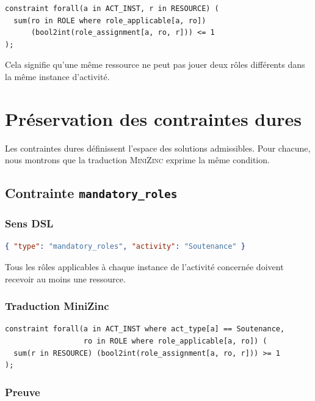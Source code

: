 \documentclass[12pt,a4paper]{article}
\newcommand{\MZN}{\textsc{MiniZinc}}
\begin{document}
\begin{lstlisting}[language=MiniZinc]
constraint forall(a in ACT_INST, r in RESOURCE) (
  sum(ro in ROLE where role_applicable[a, ro])
      (bool2int(role_assignment[a, ro, r])) <= 1
);
\end{lstlisting}

Cela signifie qu'une même ressource ne peut pas jouer deux rôles différents dans la même instance d'activité.

\section{Préservation des contraintes dures}

Les contraintes dures définissent l'espace des solutions admissibles. Pour chacune, nous montrons que la traduction \MZN{} exprime la même condition.

\subsection{Contrainte \texttt{mandatory\_roles}}

\subsubsection*{Sens DSL}

\begin{lstlisting}[language=JSON]
{ "type": "mandatory_roles", "activity": "Soutenance" }
\end{lstlisting}

Tous les rôles applicables à chaque instance de l'activité concernée doivent recevoir au moins une ressource.

\subsubsection*{Traduction MiniZinc}

\begin{lstlisting}[language=MiniZinc]
constraint forall(a in ACT_INST where act_type[a] == Soutenance,
                  ro in ROLE where role_applicable[a, ro]) (
  sum(r in RESOURCE) (bool2int(role_assignment[a, ro, r])) >= 1
);
\end{lstlisting}

\subsubsection*{Preuve}
\end{document}

